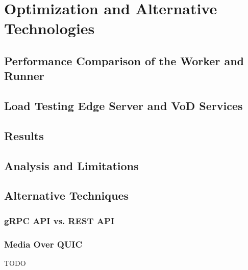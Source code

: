 
\chapter{Optimization and Alternative Technologies}\label{chapter:optimization_and_alternative_technologies}

\section{Performance Comparison of the Worker and Runner}
\section{Load Testing Edge Server and VoD Services}
\section{Results}
\section{Analysis and Limitations}
\section{Alternative Techniques}
\subsection{gRPC API vs. REST API}
\subsection{Media Over QUIC}

TODO